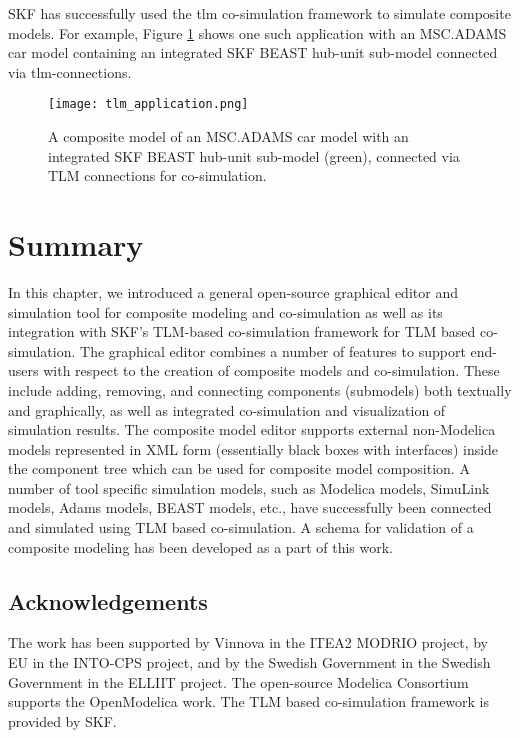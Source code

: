 SKF has successfully used the \acrshort{tlm} co-simulation framework to simulate composite models. For
example, Figure \ref{fig:tlmapplication} shows one such application with an MSC.ADAMS \cite{adams} car model
containing an integrated SKF BEAST\cite{beast} hub-unit sub-model 
connected via \acrshort{tlm}-connections.

\begin{figure}
	\texttt{[image: tlm\_application.png]}
	\caption{A composite model of an MSC.ADAMS car model with an integrated SKF BEAST hub-unit sub-model (green), connected 
		     via TLM connections for co-simulation.}
	\label{fig:tlmapplication}
\end{figure}

\section{Summary}
\label{sec:tlmsummary}

In this chapter, we introduced a general open-source graphical editor and simulation tool for composite modeling and co-simulation as well as its integration with SKF’s TLM-based co-simulation framework for TLM based co-simulation. The graphical editor combines a number of features to support end-users with respect to the creation of composite models and co-simulation. These include adding, removing, and connecting components (submodels) both textually and graphically, as well as integrated co-simulation and visualization of simulation results. The composite model editor supports external non-Modelica models represented in XML form (essentially black boxes with interfaces) inside the component tree which can be used for composite model composition. A number of tool specific simulation models, such as Modelica models, SimuLink models, Adams models, BEAST models,
etc., have successfully been connected and simulated using TLM based co-simulation. A schema for validation of a composite modeling has been developed as a part of this work. 

\subsection*{Acknowledgements}
\label{sec:tlmAcknowledgements}

The work has been supported by Vinnova in the ITEA2
MODRIO project, by EU in the INTO-CPS project, and by the Swedish Government in the Swedish
Government in the ELLIIT project. The open-source Modelica Consortium supports the OpenModelica
work. The TLM based co-simulation framework is provided by SKF.





